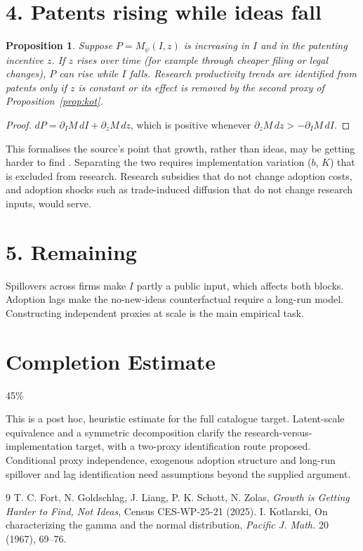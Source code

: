 \documentclass[11pt]{article}
\newtheorem{proposition}[theorem]{Proposition}
\theoremstyle{definition}
\begin{document}
\section*{4. Patents rising while ideas fall}
\begin{proposition}\label{prop:patents}
Suppose $P=M_\psi(I,z)$ is increasing in $I$ and in the patenting incentive $z$. If $z$ rises over time (for example through
cheaper filing or legal changes), $P$ can rise while $I$ falls. Research productivity trends are identified from patents
only if $z$ is constant or its effect is removed by the second proxy of Proposition~\ref{prop:kot}.
\end{proposition}
\begin{proof}
$dP=\partial_IM\,dI+\partial_zM\,dz$, which is positive whenever $\partial_zM\,dz>-\partial_IM\,dI$.
\end{proof}
This formalises the source's point that growth, rather than ideas, may be getting harder to find \cite{fglsz}. Separating the
two requires implementation variation ($b$, $K$) that is excluded from research. Research subsidies that do not change
adoption costs, and adoption shocks such as trade-induced diffusion that do not change research inputs, would serve.

\section*{5. Remaining}
Spillovers across firms make $I$ partly a public input, which affects both blocks. Adoption lags make the
no-new-ideas counterfactual require a long-run model. Constructing independent proxies at scale is the main empirical task.

\section{Completion Estimate}
45\%

This is a post hoc, heuristic estimate for the full catalogue target.
Latent-scale equivalence and a symmetric decomposition clarify the research-versus-implementation target, with a two-proxy identification route proposed. Conditional proxy independence, exogenous adoption structure and long-run spillover and lag identification need assumptions beyond the supplied argument.

\begin{thebibliography}{9}
 T. C. Fort, N. Goldschlag, J. Liang, P. K. Schott, N. Zolas, \emph{Growth is Getting Harder to Find, Not Ideas}, Census CES-WP-25-21 (2025).
 I. Kotlarski, On characterizing the gamma and the normal distribution, \emph{Pacific J. Math.} 20 (1967), 69--76.
\end{thebibliography}
\end{document}
